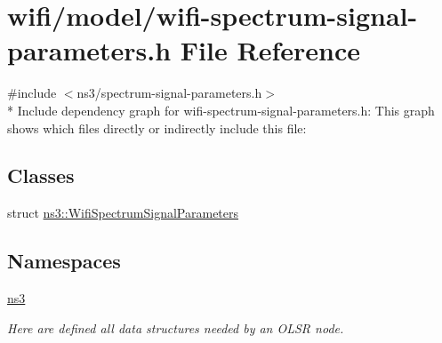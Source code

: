 \hypertarget{wifi-spectrum-signal-parameters_8h}{}\section{wifi/model/wifi-\/spectrum-\/signal-\/parameters.h File Reference}
\label{wifi-spectrum-signal-parameters_8h}
{\ttfamily \#include $<$ns3/spectrum-\/signal-\/parameters.\+h$>$}\\*
Include dependency graph for wifi-\/spectrum-\/signal-\/parameters.h\+:
This graph shows which files directly or indirectly include this file\+:
\subsection*{Classes}
\begin{DoxyCompactItemize}
\item 
struct \hyperlink{structns3_1_1WifiSpectrumSignalParameters}{ns3\+::\+Wifi\+Spectrum\+Signal\+Parameters}
\end{DoxyCompactItemize}
\subsection*{Namespaces}
\begin{DoxyCompactItemize}
\item 
 \hyperlink{namespacens3}{ns3}
\begin{DoxyCompactList}\small\item\em Here are defined all data structures needed by an O\+L\+SR node. \end{DoxyCompactList}\end{DoxyCompactItemize}
